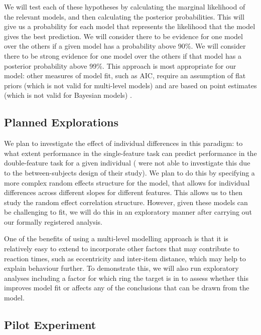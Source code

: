 \documentclass[preprint,12pt,authoryear]{elsarticle}
\begin{document}
We will test each of these hypotheses by calculating the marginal likelihood of the relevant models, and then calculating the posterior probabilities. This will give us a probability for each model that represents the likelihood that the model gives the best prediction. We will consider there to be evidence for one model over the others if a given model has a probability above 90\%. We will consider there to be strong evidence for one model over the others if that model has a posterior probability above 99\%. This approach is most appropriate for our model: other measures of model fit, such as AIC, require an assumption of flat priors (which is not valid for multi-level models) and are based on point estimates (which is not valid for Bayesian models) \citep{mcelreath2020statistical}.

\subsection{Planned Explorations}

We plan to investigate the effect of individual differences in this paradigm: to what extent performance in the single-feature task can predict performance in the double-feature task for a given individual (\cite{buetti2019predicting} were not able to investigate this due to the between-subjects design of their study). We plan to do this by specifying a more complex random effects structure for the model, that allows for individual differences across different slopes for different features. This allows us to then study the random effect correlation structure. However, given these models can be challenging to fit, we will do this in an exploratory manner after carrying out our formally registered analysis.

One of the benefits of using a multi-level modelling approach is that it is relatively easy to extend to incorporate other factors that may contribute to reaction times, such as eccentricity and inter-item distance, which may help to explain behaviour further. To demonstrate this, we will also run exploratory analyses including a factor for which ring the target is in to assess whether this improves model fit or affects any of the conclusions that can be drawn from the model.

\subsection{Pilot Experiment}
\end{document}
